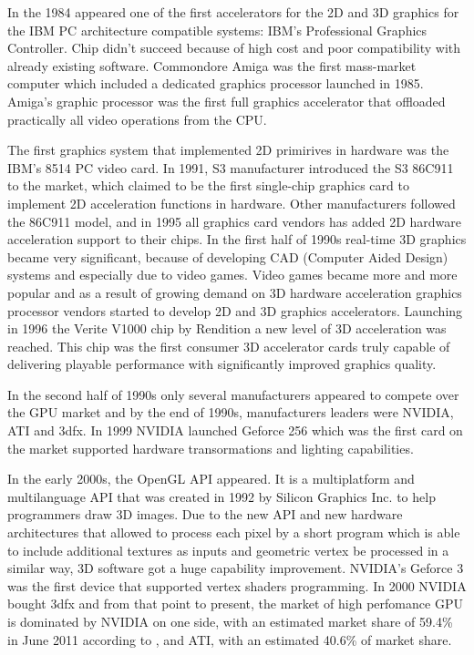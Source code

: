 \documentclass[thesis=M,english]{FITthesis}[2011/07/15]
\begin{document}
In the 1984 appeared one of the first accelerators for the 2D and 3D graphics for the IBM PC architecture compatible systems: IBM's Professional Graphics Controller. Chip didn't succeed because of high cost and poor compatibility with already existing software. Commondore Amiga was the first mass-market computer which included a dedicated graphics processor launched in 1985. Amiga's graphic processor was the first full graphics accelerator that offloaded practically all video operations from the CPU.

The first graphics system that implemented 2D primirives in hardware was the IBM's 8514 PC video card. In 1991, S3 manufacturer introduced the S3 86C911 to the market, which claimed to be the first single-chip graphics card to implement 2D acceleration functions in hardware. Other manufacturers followed the 86C911 model, and in 1995 all graphics card vendors has added 2D hardware acceleration support to their chips. In the first half of 1990s real-time 3D graphics became very significant, because of developing CAD (Computer Aided Design) systems and especially due to video games. Video games became more and more popular and as a result of growing demand on 3D hardware acceleration graphics processor vendors started to develop 2D and 3D graphics accelerators. Launching in 1996 the Verite V1000 chip by Rendition a new level of 3D acceleration was reached. This chip was the first consumer 3D accelerator cards truly capable of delivering playable performance with significantly improved graphics quality.

In the second half of 1990s only several manufacturers appeared to compete over the GPU market and by the end of 1990s, manufacturers leaders were NVIDIA, ATI and 3dfx. In 1999 NVIDIA launched Geforce 256 which was the first card on the market supported hardware transormations and lighting capabilities. 

In the early 2000s, the OpenGL API appeared. It is a multiplatform and multilanguage API that was created in 1992 by Silicon Graphics Inc. to help programmers draw 3D images. Due to the new API and new hardware architectures that allowed to process each pixel by a short program which is able to include additional textures as inputs and geometric vertex be processed in a similar way, 3D software got a huge capability improvement. NVIDIA's Geforce 3 was the first device that supported vertex shaders programming. In 2000 NVIDIA bought 3dfx and from that point to present, the market of high perfomance GPU is dominated by NVIDIA on one side, with an estimated market share of 59.4\% in June 2011 according to \cite{gpu_marketshare}, and ATI, with an estimated 40.6\% of market share.
\end{document}
